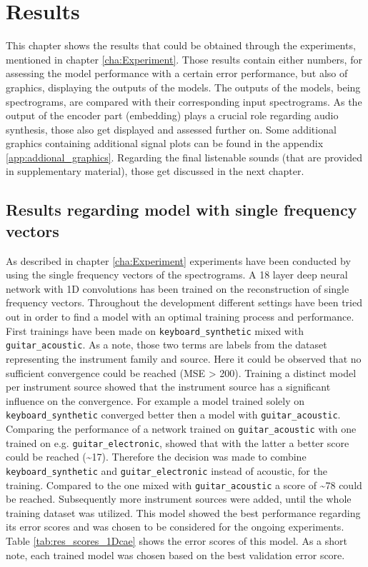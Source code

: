 \chapter[Results]{Results}
\label{cha:Results}

This chapter shows the results that could be obtained through the experiments, mentioned in chapter \ref{cha:Experiment}. Those results contain either numbers, for assessing the model performance with a certain error performance, but also of graphics, displaying the outputs of the models. The outputs of the models, being spectrograms, are compared with their corresponding input spectrograms. As the output of the encoder part (embedding) plays a crucial role regarding audio synthesis, those also get displayed and assessed further on. Some additional graphics containing additional signal plots can be found in the appendix \ref{app:addional_graphics}. Regarding the final listenable sounds (that are provided in supplementary material), those get discussed in the next chapter.

\section{Results regarding model with single frequency vectors}
As described in chapter \ref{cha:Experiment} experiments have been conducted by using the single frequency vectors of the spectrograms. A 18 layer deep neural network with 1D convolutions has been trained on the reconstruction of single frequency vectors. 
Throughout the development different settings have been tried out in order to find a model with an optimal training process and performance. First trainings have been made on \texttt{keyboard\_synthetic} mixed with \texttt{guitar\_acoustic}. As a note, those two terms are labels from the dataset representing the instrument family and source. Here it could be observed that no sufficient convergence could be reached (MSE > 200). Training a distinct model per instrument source showed that the instrument source has a significant influence on the convergence. For example a model trained solely on \texttt{keyboard\_synthetic} converged better then a model with \texttt{guitar\_acoustic}. Comparing the performance of a network trained on \texttt{guitar\_acoustic} with one trained on e.g. \texttt{guitar\_electronic}, showed that with the latter a better score could be reached (\textasciitilde 17). Therefore the decision was made to combine \texttt{keyboard\_synthetic} and \texttt{guitar\_electronic} instead of acoustic, for the training. Compared to the one mixed with \texttt{guitar\_acoustic} a score of \textasciitilde 78 could be reached. Subsequently more instrument sources were added, until the whole training dataset was utilized. This model showed the best performance regarding its error scores and was chosen to be considered for the ongoing experiments. Table \ref{tab:res_scores_1Dcae} shows the error scores of this model. As a short note, each trained model was chosen based on the best validation error score. 

